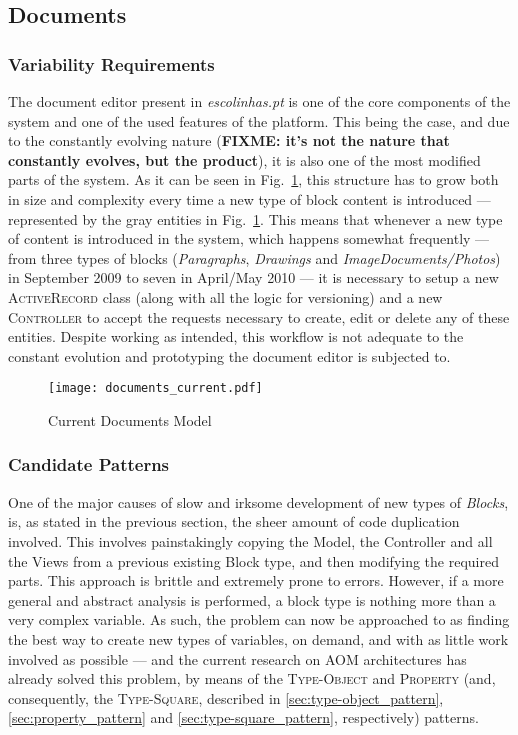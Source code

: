 \subsection{Documents}\label{sec:fa_documents}

\subsubsection{Variability Requirements}\label{sec:fa_documents_variability_requirements}

The document editor present in \emph{escolinhas.pt} is one of the core components of the system and one of the used features of the platform. This being the case, and due to the constantly evolving nature (\textbf{FIXME: it's not the nature that constantly evolves, but the product}), it is also one of the most modified parts of the system. As it can be seen in Fig.~\ref{fig:documents_current}, this structure has to grow both in size and complexity every time a new type of block content is introduced --- represented by the gray entities in Fig.~\ref{fig:documents_current}. This means that whenever a new type of content is introduced in the system, which happens somewhat frequently --- from three types of blocks (\emph{Paragraphs}, \emph{Drawings} and \emph{ImageDocuments/Photos}) in September 2009 to seven in April/May 2010 --- it is necessary to setup a new \textsc{ActiveRecord} class (along with all the logic for versioning) and a new \textsc{Controller} to accept the requests necessary to create, edit or delete any of these entities. Despite working as intended, this workflow is not adequate to the constant evolution and prototyping the document editor is subjected to.

\begin{figure}[H]
  \centering
  \texttt{[image: documents\_current.pdf]}
  \caption{Current Documents Model}
  \label{fig:documents_current}
\end{figure}

\subsubsection{Candidate Patterns}\label{sec:fa_documents_candidate_patterns}

One of the major causes of slow and irksome development of new types of \emph{Blocks}, is, as stated in the previous section, the sheer amount of code duplication involved. This involves painstakingly copying the Model, the Controller and all the Views from a previous existing Block type, and then modifying the required parts. This approach is brittle and extremely prone to errors. However, if a more general and abstract analysis is performed, a block type is nothing more than a very complex variable. As such, the problem can now be approached to as finding the best way to create new types of variables, on demand, and with as little work involved as possible --- and the current research on AOM architectures has already solved this problem, by means of the \textsc{Type-Object} and \textsc{Property} (and, consequently, the \textsc{Type-Square}, described in \ref{sec:type-object_pattern}, \ref{sec:property_pattern} and \ref{sec:type-square_pattern}, respectively) patterns.

